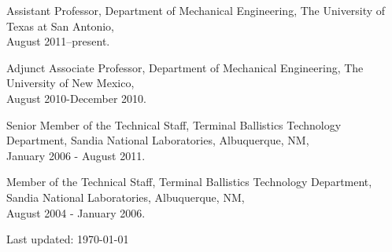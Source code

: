 \documentclass[12 pt,letterpaper]{article}
\renewenvironment{itemize}{
  \begin{list}{}{
    \setlength{\leftmargin}{1.5em}
    \setlength{\itemsep}{0.25em}
    \setlength{\parskip}{0pt}
    \setlength{\parsep}{0.25em}
  }
}{
  \end{list}
}
\begin{document}
\begin{itemize}
\item Assistant Professor, Department of Mechanical Engineering, The University of Texas at San Antonio,\\
  August 2011--present. 

\item Adjunct Associate Professor, Department of Mechanical Engineering, The University of New Mexico, \\August 2010-December 2010.

\item Senior Member of the Technical Staff, Terminal Ballistics Technology Department, Sandia National Laboratories, Albuquerque, NM, \\ January 2006 - August 2011.

\item Member of the Technical Staff, Terminal Ballistics Technology Department, Sandia National Laboratories, Albuquerque, NM, \\ August 2004 -  January 2006.
\end{itemize}


%
%
%
%

\vfill 
\begin{center}
  \begin{small}
    Last updated: \today
  \end{small}
\end{center}


\end{document}
